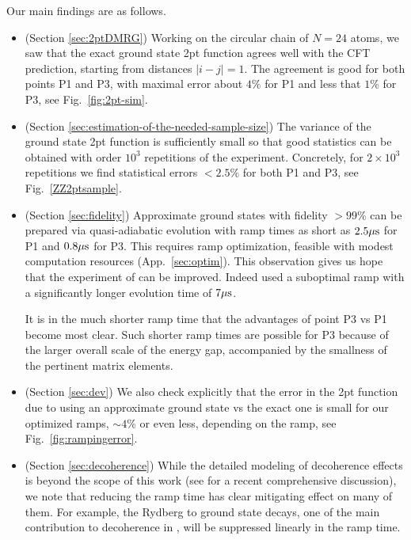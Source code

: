 \documentclass[a4paper,11pt]{article}
\theoremstyle{remark}
\theoremstyle{theorem}
\begin{document}
Our main findings are as follows.
\begin{itemize}
	\item
	(Section \ref{sec:2ptDMRG}) Working on the circular chain of $N=24$ atoms, we saw that the exact ground state 2pt function agrees well with the CFT prediction, starting from distances $|i-j|=1$. The agreement is good for both points P1 and P3, with maximal error about $4\%$ for P1 and less that $1\%$ for P3, see Fig.~\ref{fig:2pt-sim}.
	\item
	(Section \ref{sec:estimation-of-the-needed-sample-size}) The variance of the ground state 2pt function is sufficiently small so that good statistics can be obtained with order $10^3$ repetitions of the experiment. Concretely, for $2\times 10^3$ repetitions we find statistical errors $<2.5\%$ for both P1 and P3, see Fig.~\ref{ZZ2ptsample}.
	\item
	(Section \ref{sec:fidelity}) Approximate ground states with fidelity $>99\%$ can be prepared via quasi-adiabatic evolution with ramp times as short as $2.5\mu{\rm s}$ for P1 and $0.8\mu{\rm s}$ for P3. This requires ramp optimization, feasible with modest computation resources (App.~\ref{sec:optim}). This observation gives us hope that the experiment of \cite{Fang:2024uyf} can be improved. Indeed \cite{Fang:2024uyf} used a suboptimal ramp with a significantly longer evolution time of $7\mu{\rm s}$.
	
	It is in the much shorter ramp time that the advantages of point P3 vs P1 become most clear. Such shorter ramp times are possible for P3 because of the larger overall scale of the energy gap, accompanied by the smallness of the pertinent matrix elements.
	
	\item (Section \ref{sec:dev}) We also check explicitly that the error in the 2pt function due to using an approximate ground state vs the exact one is small for our optimized ramps, $\sim 4\%$ or even less, depending on the ramp, see Fig.~\ref{fig:rampingerror}.
	
	\item (Section \ref{sec:decoherence}) While the detailed modeling of decoherence effects is beyond the scope of this work (see \cite{Dalyac:2026jpu} for a recent comprehensive discussion), we note that reducing the ramp time has clear mitigating effect on many of them. For example, the Rydberg to ground state decays, one of the main contribution to decoherence in \cite{Fang:2024uyf}, will be suppressed linearly in the ramp time. 
\end{itemize}
\end{document}
